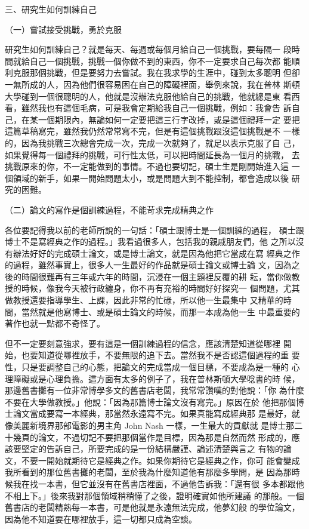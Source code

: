三、研究生如何訓練自己

（一）嘗試接受挑戰，勇於克服

研究生如何訓練自己？就是每天、每週或每個月給自己一個挑戰，要每隔一
段時間就給自己一個挑戰，挑戰一個你做不到的東西，你不一定要求自己每次都
能順利克服那個挑戰，但是要努力去嘗試。我在我求學的生涯中，碰到太多聰明
但卻一無所成的人，因為他們很容易困在自己的障礙裡面，舉例來說，我在普林
斯頓大學碰到一個很聰明的人，他就是沒辦法克服他給自己的挑戰，他就總是東
看西看，雖然我也有這個毛病，可是我會定期給我自己一個挑戰，例如：我會告
訴自己，在某一個期限內，無論如何一定要把這三行字改掉，或是這個禮拜一定
要把這篇草稿寫完，雖然我仍然常常寫不完，但是有這個挑戰跟沒這個挑戰是不
一樣的，因為我挑戰三次總會完成一次，完成一次就夠了，就足以表示克服了自
己，如果覺得每一個禮拜的挑戰，可行性太低，可以把時間延長為一個月的挑戰，
去挑戰原來的你，不一定能做到的事情。不過也要切記，碩士生是剛開始進入這
一個領域的新手，如果一開始問題太小，或是問題大到不能控制，都會造成以後
研究的困難。 

（二）論文的寫作是個訓練過程，不能苛求完成精典之作

各位要記得我以前的老師所說的一句話：「碩士跟博士是一個訓練的過程，
碩士跟博士不是寫經典之作的過程。」我看過很多人，包括我的親戚朋友們，他
之所以沒有辦法好好的完成碩士論文，或是博士論文，就是因為他把它當成在寫
經典之作的過程，雖然事實上，很多人一生最好的作品就是碩士論文或博士論
文，因為之後的時間很難再有三年或六年的時間，沉浸在一個主題裡反覆的耕
耘，當你做教授的時候，像我今天被行政纏身，你不再有充裕的時間好好探究一
個問題，尤其做教授還要指導學生、上課，因此非常的忙碌，所以他一生最集中
又精華的時間，當然就是他寫博士、或是碩士論文的時候，而那一本成為他一生
中最重要的著作也就一點都不奇怪了。 

但不一定要刻意強求，要有這是一個訓練過程的信念，應該清楚知道從哪裡
開始，也要知道從哪裡放手，不要無限的追下去。當然我不是否認這個過程的重
要性，只是要調整自己的心態，把論文的完成當成一個目標，不要成為是一種的
心理障礙或是心理負擔。這方面有太多的例子了，我在普林斯頓大學唸書的時
候，那邊舊書攤有一位非常博學多文的舊書店老闆，我常常讚嘆的對他說：「你
為什麼不要在大學做教授。」他說：「因為那篇博士論文沒有寫完。」原因在於
他把那個博士論文當成要寫一本經典，那當然永遠寫不完。如果真能寫成經典那
是最好，就像美麗新境界那部電影的男主角 John Nash 一樣，一生最大的貢獻就
是博士那二十幾頁的論文，不過切記不要把那個當作是目標，因為那是自然而然
形成的，應該要堅定的告訴自己，所要完成的是一份結構嚴謹、論述清楚與言之
有物的論文，不要一開始就期待它是經典之作。如果你期待它是經典之作，你可
能會變成我所看到的那位舊書攤的老闆，至於我為什麼知道他有那麼多學問，是
因為那時候我在找一本書，但它並沒有在舊書店裡面，不過他告訴我：「還有很
多本都跟他不相上下。」後來我對那個領域稍稍懂了之後，證明確實如他所建議
的那般。一個舊書店的老闆精熟每一本書，可是他就是永遠無法完成，他夢幻般
的學位論文，因為他不知道要在哪裡放手，這一切都只成為空談。

